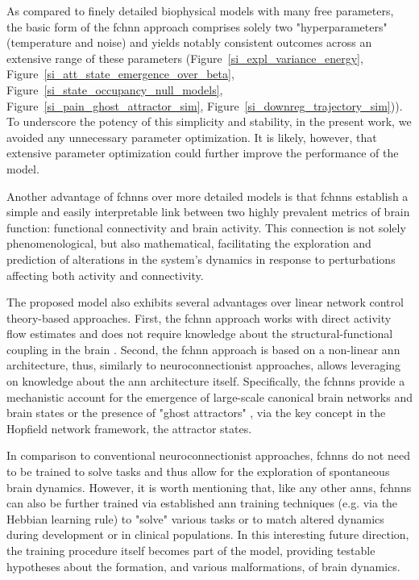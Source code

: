 \documentclass{article}
\begin{document}
As compared to finely detailed biophysical models with many free parameters, the basic form of the \acrshort{fchnn} approach comprises solely two "hyperparameters" (temperature and noise) and yields notably consistent outcomes across an extensive range of these parameters (Figure~\ref{si_expl_variance_energy}, Figure~\ref{si_att_state_emergence_over_beta}, Figure~\ref{si_state_occupancy_null_models}, Figure~\ref{si_pain_ghost_attractor_sim}, Figure~\ref{si_downreg_trajectory_sim})). To underscore the potency of this simplicity and stability, in the present work, we avoided any unnecessary parameter optimization. It is likely, however, that extensive parameter optimization could further improve the performance of the model.

Another advantage of \acrshort{fchnn}s over more detailed models is that \acrshort{fchnn}s establish a simple and easily interpretable link between two highly prevalent metrics of brain function: functional connectivity and brain activity. This connection is not solely phenomenological, but also mathematical, facilitating the exploration and prediction of alterations in the system's dynamics in response to perturbations affecting both activity and connectivity.

The proposed model also exhibits several advantages over linear network control theory-based \citep{gu2015controllability} approaches. First, the \acrshort{fchnn} approach works with direct activity flow estimates and does not require knowledge about the structural-functional coupling in the brain \citep{seguin2023brain}. Second, the \acrshort{fchnn} approach is based on a non-linear \acrshort{ann} architecture, thus, similarly to neuroconnectionist approaches, allows leveraging on knowledge about the \acrshort{ann} architecture itself. Specifically, the \acrshort{fchnn}s provide a mechanistic account for the emergence of large-scale canonical brain networks \citep{zalesky2014time} and brain states or the presence of "ghost attractors" \citep{deco2012ongoing, vohryzek2020ghost}, via the key concept in the Hopfield network framework, the attractor states.

In comparison to conventional neuroconnectionist approaches, \acrshort{fchnn}s do not need to be trained to solve tasks and thus allow for the exploration of spontaneous brain dynamics. However, it is worth mentioning that, like any other \acrshort{ann}s, \acrshort{fchnn}s can also be further trained via established \acrshort{ann} training techniques (e.g. via the Hebbian learning rule) to "solve" various tasks or to match altered dynamics during development or in clinical populations. In this interesting future direction, the training procedure itself becomes part of the model, providing testable hypotheses about the formation, and various malformations, of brain dynamics.
\end{document}
